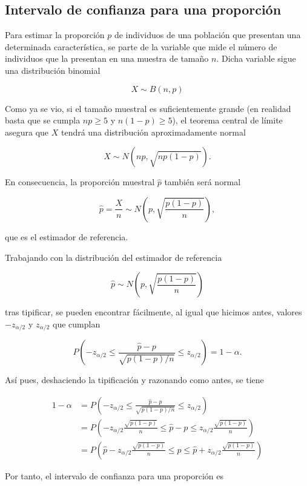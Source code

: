 \documentclass[
  a4paper,
]{scrreport}
\theoremstyle{definition}
\theoremstyle{definition}
\theoremstyle{plain}
\theoremstyle{remark}
\begin{document}
\hypertarget{intervalo-de-confianza-para-una-proporciuxf3n}{%
\subsection{Intervalo de confianza para una
proporción}\label{intervalo-de-confianza-para-una-proporciuxf3n}}

Para estimar la proporción \(p\) de individuos de una población que
presentan una determinada característica, se parte de la variable que
mide el número de individuos que la presentan en una muestra de tamaño
\(n\). Dicha variable sigue una distribución binomial

\[
X\sim B(n,p)
\]

Como ya se vio, si el tamaño muestral es suficientemente grande (en
realidad basta que se cumpla \(np\geq 5\) y \(n(1-p)\geq 5\)), el
teorema central de límite asegura que \(X\) tendrá una distribución
aproximadamente normal

\[
X\sim N(np,\sqrt{np(1-p)}).
\]

En consecuencia, la proporción muestral \(\hat p\) también será normal

\[
\hat{p}=\frac{X}{n} \sim N\left(p,\sqrt{\frac{p(1-p)}{n}}\right),
\]

que es el estimador de referencia.

Trabajando con la distribución del estimador de referencia

\[
\hat p\sim N\left(p,\sqrt{\frac{p(1-p)}{n}}\right)
\]

tras tipificar, se pueden encontrar fácilmente, al igual que hicimos
antes, valores \(-z_{\alpha/2}\) y \(z_{\alpha/2}\) que cumplan

\[
P\left(-z_{\alpha/2}\leq \frac{\hat p-p}{\sqrt{p(1-p)/n}}\leq z_{\alpha/2} \right) = 1-\alpha.
\]

Así pues, deshaciendo la tipificación y razonando como antes, se tiene

\begin{align*}
1-\alpha 
&= P\left(-z_{\alpha/2}\leq \frac{\hat p-p}{\sqrt{p(1-p)/n}}\leq z_{\alpha/2} \right) \\
&= P\left(-z_{\alpha/2}\frac{\sqrt{p(1-p)}}{n}\leq \hat p-p\leq z_{\alpha/2}\frac{\sqrt{p(1-p)}}{n} \right) \\
&= P\left(\hat{p}-z_{\alpha/2}\frac{\sqrt{p(1-p)}}{n}\leq p\leq \hat{p}+z_{\alpha/2}\frac{\sqrt{p(1-p)}}{n} \right)
\end{align*}

Por tanto, el intervalo de confianza para una proporción es
\end{document}
